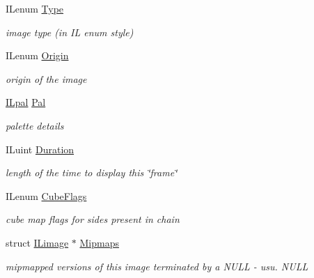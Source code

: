 \begin{DoxyCompactItemize}
\mbox{\label{structILimage_af84630dff97fdc18dcf1c8187f5e1918}} 
I\+Lenum \hyperlink{structILimage_af84630dff97fdc18dcf1c8187f5e1918}{Type}
\begin{DoxyCompactList}\small\item\em image type (in IL enum style) \end{DoxyCompactList}\item 
\mbox{\label{structILimage_ac2bc011c3f8a65eea30a8d4495c96a2e}} 
I\+Lenum \hyperlink{structILimage_ac2bc011c3f8a65eea30a8d4495c96a2e}{Origin}
\begin{DoxyCompactList}\small\item\em origin of the image \end{DoxyCompactList}\item 
\mbox{\label{structILimage_a1e17c6b3c912a9bcddb50dd7a61011a7}} 
\hyperlink{structILpal}{I\+Lpal} \hyperlink{structILimage_a1e17c6b3c912a9bcddb50dd7a61011a7}{Pal}
\begin{DoxyCompactList}\small\item\em palette details \end{DoxyCompactList}\item 
\mbox{\label{structILimage_afde5827e053680ff1e81a9a9c0832042}} 
I\+Luint \hyperlink{structILimage_afde5827e053680ff1e81a9a9c0832042}{Duration}
\begin{DoxyCompactList}\small\item\em length of the time to display this \char`\"{}frame\char`\"{} \end{DoxyCompactList}\item 
\mbox{\label{structILimage_a20bd452e1573aa08c7d9687190cbfa89}} 
I\+Lenum \hyperlink{structILimage_a20bd452e1573aa08c7d9687190cbfa89}{Cube\+Flags}
\begin{DoxyCompactList}\small\item\em cube map flags for sides present in chain \end{DoxyCompactList}\item 
\mbox{\label{structILimage_afa2c8bedcd1178760327302911969035}} 
struct \hyperlink{structILimage}{I\+Limage} $\ast$ \hyperlink{structILimage_afa2c8bedcd1178760327302911969035}{Mipmaps}
\begin{DoxyCompactList}\small\item\em mipmapped versions of this image terminated by a N\+U\+LL -\/ usu. N\+U\+LL \end{DoxyCompactList}\item 

\end{DoxyCompactItemize}
